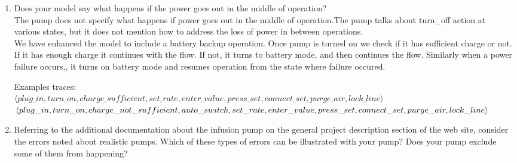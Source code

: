 ﻿\documentclass{article}
\begin{document}
\begin{enumerate}
    \item Does your model say what happens if the power goes out in the middle of operation?\\
    The pump does not specify what happens if power goes out in the middle of operation.The pump talks about turn\_off action at various states, but it does not mention
    how to address the loss of power in between operations. \\


We have enhanced the model to include a battery backup operation. Once pump is turned on we check if it has sufficient charge or not. If it has enough charge it continues with the flow. If not, it turns to battery mode, and then continues the flow. Similarly when a power failure occurs,, it turns on battery mode and resumes operation from the state where failure occured.


    Examples traces: \\


   $ \langle plug\_in,turn\_on,charge\_sufficient,set\_rate,enter\_value,press\_set, connect\_set,
purge\_air,lock\_line \rangle $\\


   $ \langle plug\_in,turn\_on,charge\_not\_sufficient,auto\_switch,set\_rate,enter\_value,press\_set, \\
connect\_set,purge\_air,lock\_line \rangle $\\


    \item Referring to the additional documentation about the infusion pump on the general project description section of the web site, consider the errors noted about realistic pumps. Which of these types of errors can be illustrated with your pump? Does your pump exclude some of them from happening? \\



\end{enumerate}
\end{document}
